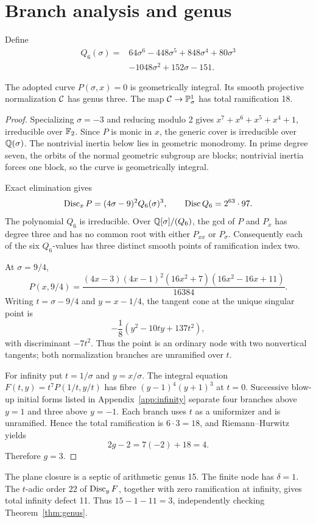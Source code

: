 \section{Branch analysis and genus}\label{sec:genus}

Define
\begin{equation}\label{eq:q6}
\begin{split}
Q_6(\sigma)={}&64\sigma^6-448\sigma^5+848\sigma^4+80\sigma^3\\
&-1048\sigma^2+152\sigma-151.
\end{split}
\end{equation}

\begin{theorem}\label{thm:genus}
The adopted curve $P(\sigma,x)=0$ is geometrically integral.  Its smooth
projective normalization $\mathcal C$ has genus three.  The map
$\mathcal C\to\mathbb P^1_\sigma$ has total ramification 18.
\end{theorem}

\begin{proof}
Specializing $\sigma=-3$ and reducing modulo 2 gives
$x^7+x^6+x^5+x^4+1$, irreducible over $\mathbb F_2$.  Since $P$ is monic in $x$,
the generic cover is irreducible over $\mathbb Q(\sigma)$.  The nontrivial inertia
below lies in geometric monodromy.  In prime degree seven, the orbits of the
normal geometric subgroup are blocks; nontrivial inertia forces one block,
so the curve is geometrically integral.

Exact elimination gives
\begin{equation}\label{eq:disc}
 \operatorname{Disc}_xP=(4\sigma-9)^2Q_6(\sigma)^3,
 \qquad \operatorname{Disc} Q_6=2^{63}\cdot97.
\end{equation}
The polynomial $Q_6$ is irreducible.  Over
$\mathbb Q[\sigma]/(Q_6)$, the gcd of $P$ and $P_x$ has degree three and has no
common root with either $P_{xx}$ or $P_\sigma$.  Consequently each of the six
$Q_6$-values has three distinct smooth points of ramification index two.

At $\sigma=9/4$,
\[
 P(x,9/4)=\frac{(4x-3)(4x-1)^2(16x^2+7)(16x^2-16x+11)}{16384}.
\]
Writing $t=\sigma-9/4$ and $y=x-1/4$, the tangent cone at the unique
singular point is
\[
 -\frac18(y^2-10ty+137t^2),
\]
with discriminant $-7t^2$.  Thus the point is an ordinary node with two
nonvertical tangents; both normalization branches are unramified over $t$.

For infinity put $t=1/\sigma$ and $y=x/\sigma$.  The integral equation
$F(t,y)=t^7P(1/t,y/t)$ has fibre
$(y-1)^4(y+1)^3$ at $t=0$.  Successive blow-up initial forms listed in
Appendix~\ref{app:infinity} separate four branches above $y=1$ and three
above $y=-1$.  Each branch uses $t$ as a uniformizer and is unramified.
Hence the total ramification is $6\cdot3=18$, and Riemann--Hurwitz yields
\[
 2g-2=7(-2)+18=4.
\]
Therefore $g=3$.
\end{proof}

The plane closure is a septic of arithmetic genus 15.  The finite node has
$\delta=1$.  The $t$-adic order 22 of $\operatorname{Disc}_yF$, together with zero
ramification at infinity, gives total infinity defect 11.  Thus
$15-1-11=3$, independently checking Theorem~\ref{thm:genus}.
